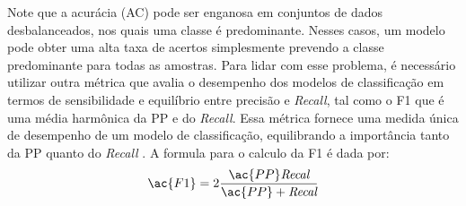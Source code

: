Note que a acurácia (AC) pode ser enganosa em conjuntos de dados desbalanceados, nos quais uma classe é predominante. Nesses casos, um modelo pode obter uma alta taxa de acertos simplesmente prevendo a classe predominante para todas as amostras. Para lidar com esse problema, é necessário utilizar outra métrica que avalia o desempenho dos modelos de classificação em termos de sensibilidade e equilíbrio entre precisão e \textit{Recall}, tal como o \ac{F1} que é uma média harmônica da \ac{PP} e do \textit{Recall}. Essa métrica fornece uma medida única de desempenho de um modelo de classificação, equilibrando a importância tanto da \ac{PP} quanto do \textit{Recall} \cite{jiang2020improved}. A formula para o calculo da \ac{F1} é dada por: 
\begin{equation}
    \label{eq:F1}
  \ac{F1} = 2 \frac{\ac{PP}  \textit{Recal}}{\ac{PP} + \textit{Recal}}
\end{equation}

